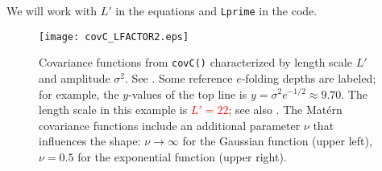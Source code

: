 \documentclass[11pt,titlepage,fleqn]{article}
\begin{document}
We will work with $L'$ in the equations and \verb+Lprime+ in the code.


\clearpage\pagebreak
\begin{figure}
\centering
\texttt{[image: covC\_LFACTOR2.eps]}
\caption[]
{{
Covariance functions from {\tt covC()} characterized by length scale $L'$ and amplitude $\sigma^2$.
See \citet[][Section 5.3.3, p. 113]{Tarantola2005}.
Some reference $e$-folding depths are labeled; for example, the $y$-values of the top line is $y = \sigma^2 e^{-1/2} \approx 9.70$.
The length scale in this example is \textcolor{red}{$L' = 22$}; see also .
The Mat\'ern covariance functions include an additional parameter $\nu$ that influences the shape: $\nu \rightarrow \infty$ for the Gaussian function (upper left), $\nu = 0.5$ for the exponential function (upper right).
\label{fig:covC2}
}}
\end{figure}

\iffalse
\clearpage\pagebreak
\begin{figure}
\centering
\texttt{[image: covC\_LFACTOR1.eps]}
\caption[]
{{
Same as \refFig{fig:covC2}, but for LFACTOR = 1.
\label{fig:covC1}
}}
\end{figure}
\fi

\end{document}
